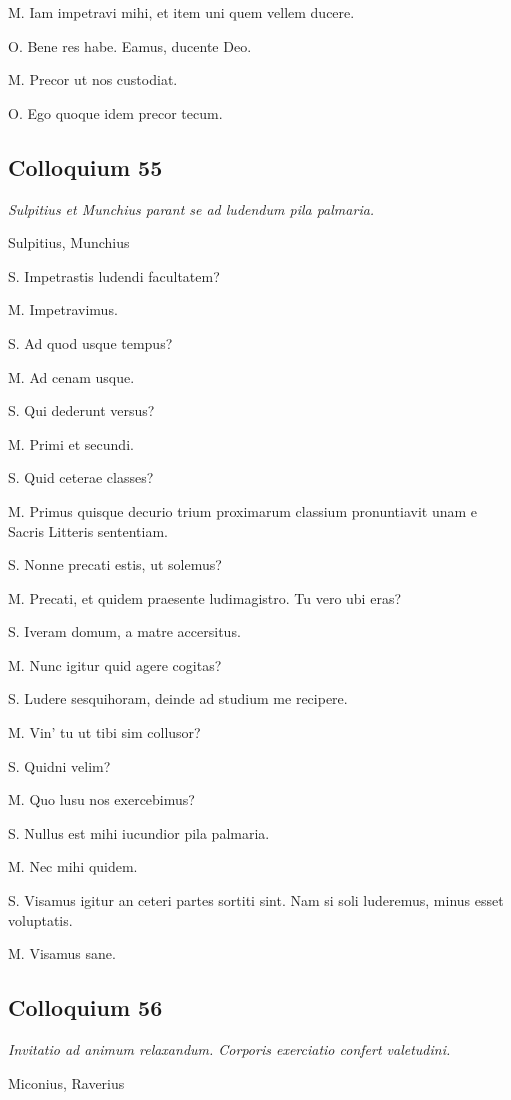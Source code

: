 \documentclass{article}
\begin{document}
M. Iam impetravi mihi, et item uni quem vellem ducere.

O. Bene res habe. Eamus, ducente Deo.

M. Precor ut nos custodiat.

O. Ego quoque idem precor tecum.

\subsection{Colloquium 55}
\emph{Sulpitius et Munchius parant se ad ludendum pila palmaria.}

Sulpitius, Munchius

S. Impetrastis ludendi facultatem?

M. Impetravimus.

S. Ad quod usque tempus?

M. Ad cenam usque.

S. Qui dederunt versus?

M. Primi et secundi.

S. Quid ceterae classes?

M. Primus quisque decurio trium proximarum classium pronuntiavit unam e Sacris Litteris sententiam.

S. Nonne precati estis, ut solemus?

M. Precati, et quidem praesente ludimagistro. Tu vero ubi eras?

S. Iveram domum, a matre accersitus.

M. Nunc igitur quid agere cogitas?

S. Ludere sesquihoram, deinde ad studium me recipere.

M. Vin' tu ut tibi sim collusor?

S. Quidni velim?

M. Quo lusu nos exercebimus?

S. Nullus est mihi iucundior pila palmaria.

M. Nec mihi quidem.

S. Visamus igitur an ceteri partes sortiti sint. Nam si soli luderemus, minus esset voluptatis.

M. Visamus sane.

\subsection{Colloquium 56}
\emph{Invitatio ad animum relaxandum. Corporis exerciatio confert valetudini.}

Miconius, Raverius
\end{document}
